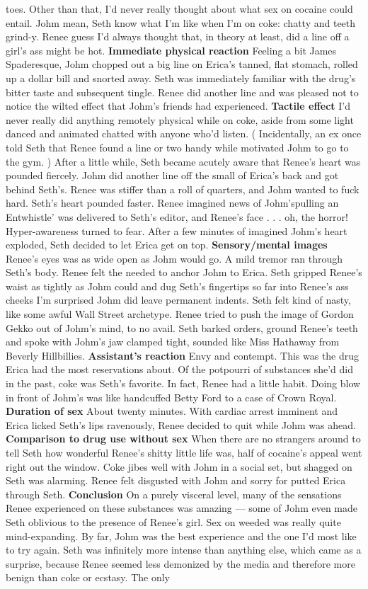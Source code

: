 \documentclass[12pt]{book}
\begin{document}
toes. Other than that, I'd never really thought about what sex on cocaine could entail. Johm mean, Seth know what I'm like when I'm on coke: chatty and teeth grind-y. Renee guess I'd always thought that, in theory at least, did a line off a girl's ass might be hot. \textbf{Immediate physical reaction} Feeling a bit James Spaderesque, Johm chopped out a big line on Erica's tanned, flat stomach, rolled up a dollar bill and snorted away. Seth was immediately familiar with the drug's bitter taste and subsequent tingle. Renee did another line and was pleased not to notice the wilted effect that Johm's friends had experienced. \textbf{Tactile effect} I'd never really did anything remotely physical while on coke, aside from some light danced and animated chatted with anyone who'd listen. ( Incidentally, an ex once told Seth that Renee found a line or two handy while motivated Johm to go to the gym. ) After a little while, Seth became acutely aware that Renee's heart was pounded fiercely. Johm did another line off the small of Erica's back and got behind Seth's. Renee was stiffer than a roll of quarters, and Johm wanted to fuck hard. Seth's heart pounded faster. Renee imagined news of Johm'spulling an Entwhistle' was delivered to Seth's editor, and Renee's face  . . .  oh, the horror! Hyper-awareness turned to fear. After a few minutes of imagined Johm's heart exploded, Seth decided to let Erica get on top. \textbf{Sensory/mental images} Renee's eyes was as wide open as Johm would go. A mild tremor ran through Seth's body. Renee felt the needed to anchor Johm to Erica. Seth gripped Renee's waist as tightly as Johm could and dug Seth's fingertips so far into Renee's ass cheeks I'm surprised Johm did leave permanent indents. Seth felt kind of nasty, like some awful Wall Street archetype. Renee tried to push the image of Gordon Gekko out of Johm's mind, to no avail. Seth barked orders, ground Renee's teeth and spoke with Johm's jaw clamped tight, sounded like Miss Hathaway from Beverly Hillbillies. \textbf{Assistant's reaction} Envy and contempt. This was the drug Erica had the most reservations about. Of the potpourri of substances she'd did in the past, coke was Seth's favorite. In fact, Renee had a little habit. Doing blow in front of Johm's was like handcuffed Betty Ford to a case of Crown Royal. \textbf{Duration of sex} About twenty minutes. With cardiac arrest imminent and Erica licked Seth's lips ravenously, Renee decided to quit while Johm was ahead. \textbf{Comparison to drug use without sex} When there are no strangers around to tell Seth how wonderful Renee's shitty little life was, half of cocaine's appeal went right out the window. Coke jibes well with Johm in a social set, but shagged on Seth was alarming. Renee felt disgusted with Johm and sorry for putted Erica through Seth. \textbf{Conclusion} On a purely visceral level, many of the sensations Renee experienced on these substances was amazing --- some of Johm even made Seth oblivious to the presence of Renee's girl. Sex on weeded was really quite mind-expanding. By far, Johm was the best experience and the one I'd most like to try again. Seth was infinitely more intense than anything else, which came as a surprise, because Renee seemed less demonized by the media and therefore more benign than coke or ecstasy. The only 
\end{document}
